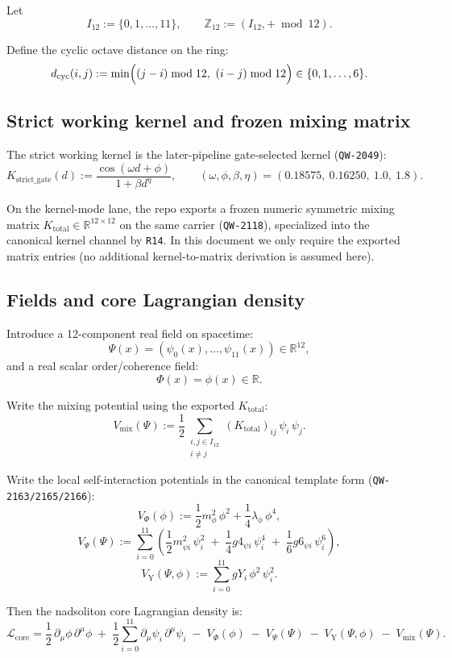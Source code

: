 \documentclass[11pt,a4paper]{article}
\begin{document}
Let
\[
I_{12}:=\{0,1,\dots,11\},
\qquad
\mathbb{Z}_{12}:=(I_{12}, + \bmod 12).
\]

Define the cyclic octave distance on the ring:
\[
d_{\mathrm{cyc}}(i,j)
:=
\min\Bigl( (j-i)\bmod 12,\ (i-j)\bmod 12 \Bigr)
\in\{0,1,\dots,6\}.
\]

\subsection{Strict working kernel and frozen mixing matrix}

The strict working kernel is the later-pipeline gate-selected kernel (\texttt{QW-2049}):
\[
K_{\mathrm{strict\_gate}}(d)
:=
\frac{\cos(\omega d+\phi)}{1+\beta d^{\eta}},
\qquad
(\omega,\phi,\beta,\eta)=(0.18575,\ 0.16250,\ 1.0,\ 1.8).
\]

On the kernel-mode lane, the repo exports a frozen numeric symmetric mixing matrix $K_{\mathrm{total}}\in\mathbb{R}^{12\times 12}$
on the same carrier (\texttt{QW-2118}), specialized into the canonical kernel channel by \texttt{R14}.
In this document we only require the exported matrix entries (no additional kernel-to-matrix derivation is assumed here).

\subsection{Fields and core Lagrangian density}

Introduce a 12-component real field on spacetime:
\[
\Psi(x)=(\psi_0(x),\dots,\psi_{11}(x))\in\mathbb{R}^{12},
\]
and a real scalar order/coherence field:
\[
\Phi(x)=\phi(x)\in\mathbb{R}.
\]

Write the mixing potential using the exported $K_{\mathrm{total}}$:
\[
V_{\mathrm{mix}}(\Psi)
:=
\frac12 \sum_{\substack{i,j\in I_{12}\\ i\neq j}} (K_{\mathrm{total}})_{ij}\,\psi_i\,\psi_j.
\]

Write the local self-interaction potentials in the canonical template form (\texttt{QW-2163/2165/2166}):
\[
V_{\Phi}(\phi)
:=
\frac12 m_{\phi}^2\,\phi^2 + \frac14 \lambda_{\phi}\,\phi^4,
\]
\[
V_{\Psi}(\Psi)
:=
\sum_{i=0}^{11}\left(
\frac12 m_{\psi i}^2\,\psi_i^2
\;+\;\frac14 g4_{\psi i}\,\psi_i^4
\;+\;\frac16 g6_{\psi i}\,\psi_i^6
\right),
\]
\[
V_{\mathrm{Y}}(\Psi,\phi)
:=
\sum_{i=0}^{11} gY_i\,\phi^2\,\psi_i^2.
\]

Then the nadsoliton core Lagrangian density is:
\[
\mathcal{L}_{\mathrm{core}}
=
\frac12\,\partial_\mu \phi\,\partial^\mu \phi
\;+\;\frac12\sum_{i=0}^{11}\partial_\mu \psi_i\,\partial^\mu \psi_i
\;-\;V_{\Phi}(\phi)
\;-\;V_{\Psi}(\Psi)
\;-\;V_{\mathrm{Y}}(\Psi,\phi)
\;-\;V_{\mathrm{mix}}(\Psi).
\]
\end{document}
